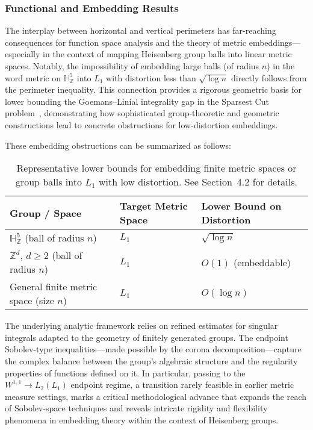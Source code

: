 \documentclass[sigconf]{acmart}
\begin{document}
\subsubsection{Functional and Embedding Results}

The interplay between horizontal and vertical perimeters has far-reaching consequences for function space analysis and the theory of metric embeddings—especially in the context of mapping Heisenberg group balls into linear metric spaces. Notably, the impossibility of embedding large balls (of radius $n$) in the word metric on $\mathbb{H}^5_{\mathbb{Z}}$ into $L_1$ with distortion less than $\sqrt{\log n}$ directly follows from the perimeter inequality. This connection provides a rigorous geometric basis for lower bounding the Goemans–Linial integrality gap in the Sparsest Cut problem~\cite{ref108}, demonstrating how sophisticated group-theoretic and geometric constructions lead to concrete obstructions for low-distortion embeddings.

These embedding obstructions can be summarized as follows:

\begin{table*}[htbp]
\centering
\caption{Representative lower bounds for embedding finite metric spaces or group balls into $L_1$ with low distortion. See Section~4.2 for details.}
\label{tab:embedding_bounds}
\begin{adjustbox}{max width=\textwidth}
\begin{tabular}{lll}
\toprule
\textbf{Group / Space} & \textbf{Target Metric Space} & \textbf{Lower Bound on Distortion}\\
\midrule
$\mathbb{H}^5_{\mathbb{Z}}$ (ball of radius $n$) & $L_1$ & $\sqrt{\log n}$\\
$\mathbb{Z}^d$, $d\geq 2$ (ball of radius $n$) & $L_1$ & $O(1)$ (embeddable)\\
General finite metric space (size $n$) & $L_1$ & $O(\log n)$\\
\bottomrule
\end{tabular}
\end{adjustbox}
\end{table*}

The underlying analytic framework relies on refined estimates for singular integrals adapted to the geometry of finitely generated groups. The endpoint Sobolev-type inequalities—made possible by the corona decomposition—capture the complex balance between the group's algebraic structure and the regularity properties of functions defined on it. In particular, passing to the $W^{1,1} \rightarrow L_2(L_1)$ endpoint regime, a transition rarely feasible in earlier metric measure settings, marks a critical methodological advance that expands the reach of Sobolev-space techniques and reveals intricate rigidity and flexibility phenomena in embedding theory within the context of Heisenberg groups.
\end{document}
